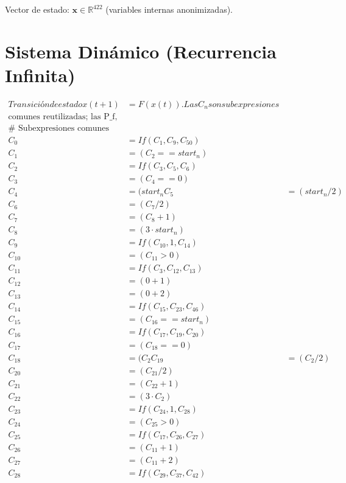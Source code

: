 \documentclass[10pt, a4paper]{article}
\begin{document}
Vector de estado: $\mathbf{x} \in \mathbb{R}^{422}$ (variables internas anonimizadas).\\\part{Sistema Dinámico (Recurrencia Infinita)}
\begin{align*}
Transición de estado x(t+1) &= F(x(t)). Las C_n son subexpresiones \\
\text{comunes reutilizadas; las P_f, relaciones de funciones recursivas.} \\
\text{# Subexpresiones comunes} \\
C_0 &= If(C_{1}, C_{9}, C_{50}) \\
C_1 &= (C_{2} == start_n) \\
C_2 &= If(C_{3}, C_{5}, C_{6}) \\
C_3 &= (C_{4} == 0) \\
C_4 &= (start_n %
C_5 &= (start_n / 2) \\
C_6 &= (C_{7} / 2) \\
C_7 &= (C_{8} + 1) \\
C_8 &= (3  \cdot  start_n) \\
C_9 &= If(C_{10}, 1, C_{14}) \\
C_10 &= (C_{11} > 0) \\
C_11 &= If(C_{3}, C_{12}, C_{13}) \\
C_12 &= (0 + 1) \\
C_13 &= (0 + 2) \\
C_14 &= If(C_{15}, C_{23}, C_{46}) \\
C_15 &= (C_{16} == start_n) \\
C_16 &= If(C_{17}, C_{19}, C_{20}) \\
C_17 &= (C_{18} == 0) \\
C_18 &= (C_{2} %
C_19 &= (C_{2} / 2) \\
C_20 &= (C_{21} / 2) \\
C_21 &= (C_{22} + 1) \\
C_22 &= (3  \cdot  C_{2}) \\
C_23 &= If(C_{24}, 1, C_{28}) \\
C_24 &= (C_{25} > 0) \\
C_25 &= If(C_{17}, C_{26}, C_{27}) \\
C_26 &= (C_{11} + 1) \\
C_27 &= (C_{11} + 2) \\
C_28 &= If(C_{29}, C_{37}, C_{42}) \\

\end{align*}
\end{document}
